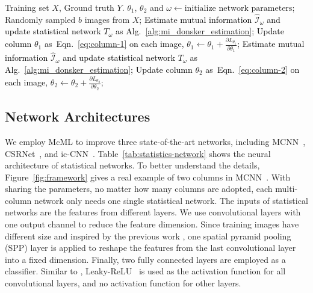 \documentclass[sigconf]{acmart}
\newcommand{\ljx}[1]{\textcolor{black}{#1}}
\newcommand{\czq}[1]{\textcolor{black}{#1}}
\newcommand{\II}{\mathcal{I}}
\newcommand\Eq{Eqn.}
\newcommand\Alg{Alg.}
\begin{document}
\setlength{\textfloatsep}{9pt}%
\begin{algorithm}[!t]
\small
\begin{algorithmic}[1]
\INPUT Training set $X$, Ground truth $Y$.
\STATE $\theta_1$, $\theta_2$ and $\omega \gets \text{initialize network parameters}$;
\REPEAT
\STATE Randomly sampled $b$ images from $X$;
\czq{\STATE Estimate mutual information $\widehat{\II}_{\omega}$ and update statistical network $T_{\omega}$ as \Alg~\ref{alg:mi_donsker_estimation};}
\STATE \czq{Update column $\theta_{1}$ as~\Eq~\ref{eq:column-1} on each image,} 
\STATE $\theta_{1} \leftarrow \theta_{1} +  \frac{\partial L_{{\theta_{1}}}}{\partial \theta_{1}}$;
\czq{\STATE Estimate mutual information $\widehat{\II}_{\omega}$ and update statistical network $T_{\omega}$ as \Alg~\ref{alg:mi_donsker_estimation};}
\STATE \czq{Update column $\theta_{2}$ as~\Eq~\ref{eq:column-2} on each image,} 
\STATE $\theta_{2} \leftarrow \theta_{2} +  \frac{\partial L_{{\theta_{2}}}}{\partial \theta_{2}}$;
\end{algorithmic} 
\caption{Mutual Learning Scheme}
\label{alg:mutual-learning}
\end{algorithm}

\vspace{-2mm}
\subsection{Network Architectures}
\label{sec:network-architecture}
We employ McML to improve three state-of-the-art networks, including MCNN~\cite{MCNN-16}, CSRNet~\cite{CSRNet-18}, and ic-CNN~\cite{deep-training-ICCNN-18}.
Table~\ref{tab:statistics-network} shows the neural architecture of statistical networks.
To better understand the details, Figure~\ref{fig:framework} gives a real example of two columns in MCNN~\cite{MCNN-16}.
With sharing the parameters, no matter how many columns are adopted, each \ljx{m}ulti-column network only needs one single statistical network.
The inputs of statistical networks are the features from different layers.
We use convolutional layers with one output channel to reduce the feature dimension.
Since training images have different size and inspired by the previous work \cite{CVPR-2017}, one spatial pyramid pooling (SPP) layer is applied to reshape the features from the last convolutional layer into a fixed dimension.
Finally, two fully connected layers are employed as a classifier.
Similar to \cite{Mime}, Leaky-ReLU~\cite{lrelu} is used as the activation function for all convolutional layers, and no activation function for other layers.
\end{document}
